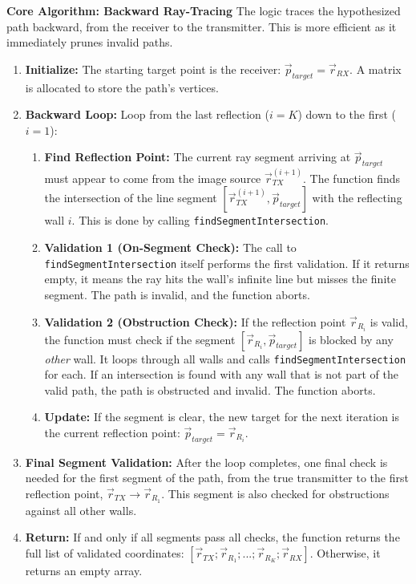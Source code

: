 \documentclass{article}
\begin{document}
	\textbf{Core Algorithm: Backward Ray-Tracing}
	The logic traces the hypothesized path backward, from the receiver to the transmitter. This is more efficient as it immediately prunes invalid paths.
	\begin{enumerate}
		\item \textbf{Initialize:} The starting target point is the receiver: $\vec{p}_{target} = \vec{r}_{RX}$. A matrix is allocated to store the path's vertices.
		\item \textbf{Backward Loop:} Loop from the last reflection ($i=K$) down to the first ($i=1$):
		\begin{enumerate}
			\item \textbf{Find Reflection Point:} The current ray segment arriving at $\vec{p}_{target}$ must appear to come from the image source $\vec{r}_{TX}^{(i+1)}$. The function finds the intersection of the line segment $[\vec{r}_{TX}^{(i+1)}, \vec{p}_{target}]$ with the reflecting wall $i$. This is done by calling \texttt{findSegmentIntersection}.
			\item \textbf{Validation 1 (On-Segment Check):} The call to \texttt{findSegmentIntersection} itself performs the first validation. If it returns empty, it means the ray hits the wall's infinite line but misses the finite segment. The path is invalid, and the function aborts.
			\item \textbf{Validation 2 (Obstruction Check):} If the reflection point $\vec{r}_{R_i}$ is valid, the function must check if the segment $[\vec{r}_{R_i}, \vec{p}_{target}]$ is blocked by any \textit{other} wall. It loops through all walls and calls \texttt{findSegmentIntersection} for each. If an intersection is found with any wall that is not part of the valid path, the path is obstructed and invalid. The function aborts.
			\item \textbf{Update:} If the segment is clear, the new target for the next iteration is the current reflection point: $\vec{p}_{target} = \vec{r}_{R_i}$.
		\end{enumerate}
		\item \textbf{Final Segment Validation:} After the loop completes, one final check is needed for the first segment of the path, from the true transmitter to the first reflection point, $\vec{r}_{TX} \rightarrow \vec{r}_{R_1}$. This segment is also checked for obstructions against all other walls.
		\item \textbf{Return:} If and only if all segments pass all checks, the function returns the full list of validated coordinates: $[\vec{r}_{TX}; \vec{r}_{R_1}; ...; \vec{r}_{R_K}; \vec{r}_{RX}]$. Otherwise, it returns an empty array.
	\end{enumerate}
	
\end{document}
